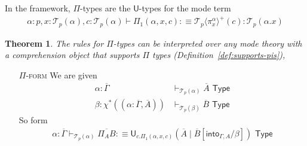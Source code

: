 \documentclass[10pt]{article}
\newtheorem{theorem}{Theorem}
\theoremstyle{definition}
\newcommand{\yields}{\vdash}
\newcommand{\TYPE}{\,\,\mathsf{Type}}
\newcommand{\telety}[3]{\ensuremath{(#1{:}#2,#3)}}
\newcommand\U[3]{\ensuremath{\mathsf{U}_{#1}(#2 \mid #3)}}
\newcommand\St[2]{\ensuremath{{#1}^*(#2)}}
\newcommand\TrPlus[2]{\ensuremath{{#1}^+(#2)}}
\newcommand\El[2]{\mathcal{T}_{#1}(#2)}
\newcommand\ApEl[2]{\mathcal{T}_{#1}\langle#2\rangle}
\newcommand{\upstairs}[1]{\overline{#1}}
\newcommand\into[1]{\ensuremath{\mathsf{into}_{#1}}}
\begin{document}
In the framework, $\Pi$-types are the $\mathsf{U}$-types for the mode term
\begin{align*}
\alpha : p, x : \El{p}{\alpha}, c : \El{p}{\alpha} \yields \Pi_1(\alpha,x,c) :\equiv \TrPlus{\ApEl{p}{\pi^\alpha_x}}{c} : \El{p}{\alpha.x}
\end{align*}

\begin{theorem}
The rules for $\Pi$-types can be interpreted over any mode theory with a comprehension object that supports $\Pi$ types (Definition~\ref{def:supports-pis}), 
\end{theorem}

\begin{enumerate}
\item[\textsc{$\Pi$-form}] We are given
\begin{align*}
\alpha : \upstairs{\Gamma} &\yields_{\El{p}{\alpha}} \upstairs{A} \TYPE \\
\beta : \St{\chi}{\telety{\alpha}{\upstairs{\Gamma}}{\upstairs{A}}} &\yields_{\El{p}{\beta}} \upstairs{B} \TYPE
\end{align*}
So form
\begin{align*}
\alpha : \upstairs{\Gamma} \yields_{\El{p}{\alpha}} \upstairs{\Pi_A B} :\equiv \U{c. \Pi_1(\alpha,x,c)}{\upstairs{A}}{\upstairs{B}[\into{\Gamma, A}/\beta]} \TYPE
\end{align*}


\end{enumerate}
\end{document}
